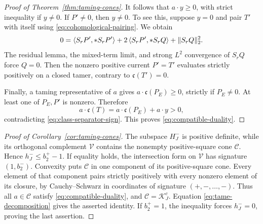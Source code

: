 \begin{proof}[Proof of Theorem~\ref{thm:taming-cones}]
It follows that \(a\cdot y\ge0\), with strict inequality if
\(y\ne0\). If \(P'\ne0\), then \(y\ne0\). To see this,
suppose \(y=0\) and pair \(T'\) with itself using
\eqref{eq:cohomological-pairing}. We obtain
\[
 0=\left\langle S_rP',*S_rP'\right\rangle+2\left\langle S_rP',*S_rQ\right\rangle+\|S_rQ\|_2^2.
\]
The residual lemma, the mixed-term limit, and strong \(L^2\)
convergence of \(S_rQ\) force \(Q=0\). Then the nonzero positive
current \(P'=T'\) evaluates strictly positively on a closed tamer,
contrary to \(\mathfrak c(T')=0\).

Finally, a taming representative of \(a\) gives
\(a\cdot\mathfrak c(P_E)\ge0\), strictly if \(P_E\ne0\).
At least one of \(P_E,P'\) is nonzero. Therefore
\[
 a\cdot\mathfrak c(T)
 =a\cdot\mathfrak c(P_E)+a\cdot y>0,
\]
contradicting \eqref{eq:class-separator-sign}. This proves
\eqref{eq:compatible-duality}.
\end{proof}

\begin{proof}[Proof of Corollary~\ref{cor:taming-cones}]
The subspace \(H_J^-\) is positive definite, while its orthogonal
complement \(\mathcal V\) contains the nonempty positive-square
cone \(\mathcal C\). Hence \(h_J^-\le b_2^+-1\). If equality
holds, the intersection form on \(\mathcal V\) has signature
\((1,b_2^-)\). Convexity puts \(\mathcal C\) in one component
of its positive-square cone. Every element of that component pairs
strictly positively with every nonzero element of its closure,
by Cauchy--Schwarz in coordinates of signature
\((+,-,\ldots,-)\). Thus all \(a\in\mathcal C\) satisfy
\eqref{eq:compatible-duality}, and
\(\mathcal C=\mathcal K_J^c\). Equation
\eqref{eq:tame-decomposition} gives the asserted identity.
If \(b_2^+=1\), the inequality forces \(h_J^-=0\), proving the
last assertion.
\end{proof}

